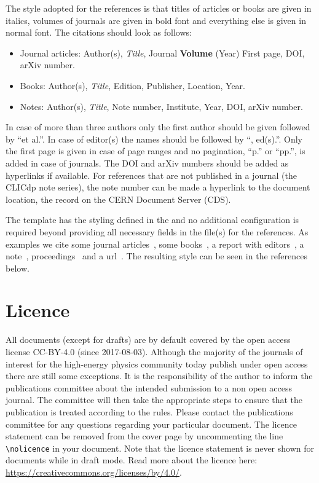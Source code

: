 The style adopted for the references is that titles of articles or books are given in italics, volumes of journals are given in bold font and everything else is given in normal font. The citations should look as follows:
\begin{itemize}
  \item Journal articles: Author(s), \textit{Title}, Journal \textbf{Volume} (Year) First page, DOI, arXiv number.
  \item Books: Author(s), \textit{Title}, Edition, Publisher, Location, Year.
  \item Notes: Author(s), \textit{Title}, Note number, Institute, Year, DOI, arXiv number.
\end{itemize}
In case of more than three authors only the first author should be given followed by ``et al.''. In case of editor(s) the names should be followed by ``, ed(s).''. Only the first page is given in case of page ranges and no pagination, \ie ``p.'' or ``pp.'', is added in case of journals. The DOI and arXiv numbers should be added as hyperlinks if available. For references that are not published in a journal (\eg the CLICdp note series), the note number can be made a hyperlink to the document location, \ie the record on the CERN Document Server (CDS).

The \latex template has the styling defined in the  and no additional configuration is required beyond providing all necessary fields in the  file(s) for the references. As examples we cite some journal articles~\cite{Higgs:1964pj,Aad:2012tfa,Chatrchyan:2012ufa}, some books~\cite{Griffiths:111880,Gunion:322177}, a report with editors~\cite{cdrvol2}, a note~\cite{Redford:1690648}, proceedings~\cite{Schulte:2001aw} and a url~\cite{lcio}. The resulting style can be seen in the references below.

\section{Licence}
\label{sec:licence}
All documents (except for drafts) are by default covered by the open access license CC-BY-4.0 (since 2017-08-03). Although the majority of the journals of interest for the high-energy physics community today publish under open access there are still some exceptions. It is the responsibility of the author to inform the publications committee about the intended submission to a non open access journal. The committee will then take the appropriate steps to ensure that the publication is treated according to the rules. Please contact the publications committee for any questions regarding your particular document. The licence statement can be removed from the cover page by uncommenting the line \texttt{\textbackslash nolicence} in your document. Note that the licence statement is never shown for documents while in draft mode. Read more about the licence here: \href{https://creativecommons.org/licenses/by/4.0/}{https://creativecommons.org/licenses/by/4.0/}.



